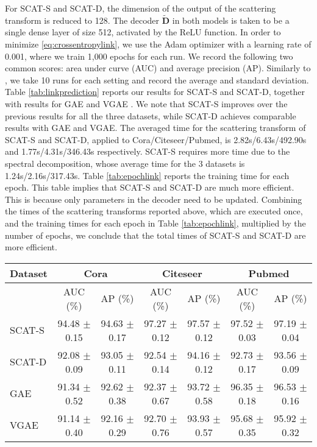 \documentclass[conference]{IEEEtran}
\def\BD{\boldsymbol{D}}
\begin{document}
For SCAT-S and SCAT-D, the dimension of the output of the scattering transform is reduced to 128. 
The decoder $\tilde{\BD}$ in both models is taken to be a single dense layer of size 512, activated by the ReLU function.   In order to minimize \eqref{eq:crossentropylink}, we use the Adam optimizer \cite{kingma2014adam} with a learning rate of 0.001, where we train 1,000 epochs for each run. We record the following two common scores: area under curve (AUC) and average precision (AP).  Similarly to \cite{kipf2016variational}, we take 10 runs for each setting and record the average and standard deviation. 
Table \ref{tab:linkprediction} reports our results for SCAT-S and SCAT-D, together with results for GAE and VGAE \cite{kipf2016variational}.
We note that SCAT-S improves over the previous results for all the three datasets, while SCAT-D achieves comparable results with GAE and VGAE. The averaged time for the scattering transform of SCAT-S and SCAT-D, applied to Cora/Citeseer/Pubmed, is {2.82s/6.43s/492.90s} and {1.77s/4.31s/346.43s} respectively. SCAT-S requires more time due to the spectral decomposition, whose average time for the 3 datasets is {1.24s/2.16s/317.43s}. Table \ref{tab:epochlink} reports the training time for each epoch. This table implies that SCAT-S and SCAT-D are much more efficient. This is because only parameters in the decoder need to be updated. 
Combining the times of the scattering transforms reported 
above, which are executed once, and the training times for each epoch in Table \ref{tab:epochlink}, multiplied by the number of epochs, we conclude that the total times of SCAT-S and SCAT-D are more efficient.

\begin{table*}[ht]
\centering
\caption{Results for link prediction using the citation datasets. We report the mean and standard deviation over 10 runs for each setting. All models for the same dataset are trained based on the same training and validating links.} 
\small
 \begin{tabular}{| l | c c | c c | c c |} 
 \hline
 Dataset & \multicolumn{2}{|c|}{Cora} & \multicolumn{2}{|c|}{Citeseer} & \multicolumn{2}{|c|}{Pubmed} \\
 \hline
  & AUC (\%) & AP (\%) & AUC (\%)  & AP (\%) & AUC (\%)  & AP (\%)  \\ [0.5ex] 
 \hline
SCAT-S & 94.48 $\pm$ 0.15 & 94.63 $\pm$ 0.17 &  97.27 $\pm$ 0.12 & 97.57 $\pm$ 0.12 &  97.52 $\pm$ 0.03 & 97.19 $\pm$ 0.04  \\
 \hline
SCAT-D & 92.08 $\pm$ 0.09 & 93.05 $\pm$ 0.11 &  92.54 $\pm$ 0.14 & 94.16 $\pm$ 0.12 &  92.73 $\pm$ 0.17 & 93.56 $\pm$ 0.09  \\
 \hline
 GAE  &  91.34 $\pm$ 0.52 & 92.62 $\pm$ 0.38 &  92.37 $\pm$ 0.67 & 93.72 $\pm$ 0.58 & 96.35 $\pm$ 0.18 & 96.53 $\pm$ 0.16 \\
 \hline
VGAE & 91.14 $\pm$ 0.40 & 92.16 $\pm$ 0.29 &  92.70 $\pm$ 0.76 & 93.93 $\pm$ 0.57 &  95.68 $\pm$ 0.35 & 95.92 $\pm$ 0.32 \\
 \hline
\end{tabular}
\label{tab:linkprediction}
\end{table*}
\end{document}
